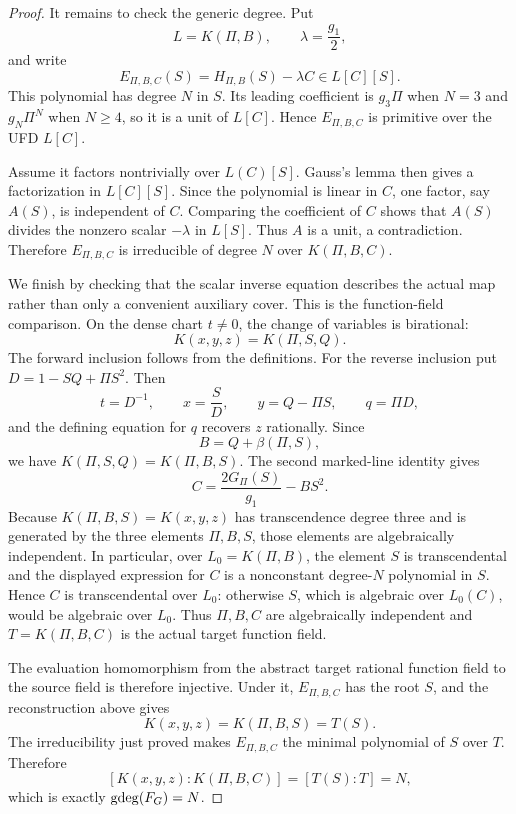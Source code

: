 \begin{proof}
It remains to check the generic degree.  Put
\[
 L=K(\Pi,B),\qquad \lambda=\frac{g_1}{2},
\]
and write
\[
 E_{\Pi,B,C}(S)=H_{\Pi,B}(S)-\lambda C\in L[C][S].
\]
This polynomial has degree $N$ in $S$.  Its leading coefficient is $g_3\Pi$
when $N=3$ and $g_N\Pi^N$ when $N\geq4$, so it is a unit of $L[C]$.  Hence
$E_{\Pi,B,C}$ is primitive over the UFD $L[C]$.

Assume it factors nontrivially over $L(C)[S]$.  Gauss's lemma then gives a
factorization in $L[C][S]$.  Since the polynomial is linear in $C$, one factor,
say $A(S)$, is independent of $C$.  Comparing the coefficient of $C$ shows
that $A(S)$ divides the nonzero scalar $-\lambda$ in $L[S]$.  Thus $A$ is a
unit, a contradiction.  Therefore $E_{\Pi,B,C}$ is irreducible of degree $N$
over $K(\Pi,B,C)$.

We finish by checking that the scalar inverse equation describes the actual
map rather than only a convenient auxiliary cover.  This is the
function-field comparison.  On the dense chart \(t\neq0\), the change of
variables is birational:
\[
 K(x,y,z)=K(\Pi,S,Q).
\]
The forward inclusion follows from the definitions.  For the reverse
inclusion put \(D=1-SQ+\Pi S^2\).  Then
\begin{equation}
 t=D^{-1},\qquad x=\frac{S}{D},\qquad
 y=Q-\Pi S,\qquad q=\Pi D,
 \label{eq:function-field-reconstruction}
\end{equation}
and the defining equation for \(q\) recovers \(z\) rationally.  Since
\[
 B=Q+\beta(\Pi,S),
\]
we have \(K(\Pi,S,Q)=K(\Pi,B,S)\).  The second marked-line identity gives
\[
 C=\frac{2G_\Pi(S)}{g_1}-BS^2.
\]
Because \(K(\Pi,B,S)=K(x,y,z)\) has transcendence degree three and is
generated by the three elements \(\Pi,B,S\), those elements are algebraically
independent.  In particular, over \(L_0=K(\Pi,B)\), the element \(S\) is
transcendental and the displayed expression for \(C\) is a nonconstant
degree-\(N\) polynomial in \(S\).  Hence \(C\) is transcendental over \(L_0\):
otherwise \(S\), which is algebraic over \(L_0(C)\), would be algebraic over
\(L_0\).  Thus \(\Pi,B,C\) are algebraically independent and
\(T=K(\Pi,B,C)\) is the actual target function field.

The evaluation homomorphism from the abstract target rational function field
to the source field is therefore injective.  Under it,
\(E_{\Pi,B,C}\) has the root \(S\), and the reconstruction above gives
\[
 K(x,y,z)=K(\Pi,B,S)=T(S).
\]
The irreducibility just proved makes \(E_{\Pi,B,C}\) the minimal polynomial
of \(S\) over \(T\).  Therefore
\[
 [K(x,y,z):K(\Pi,B,C)]=[T(S):T]=N,
\]
which is exactly \(\operatorname{gdeg}(F_G)=N\).
\end{proof}

